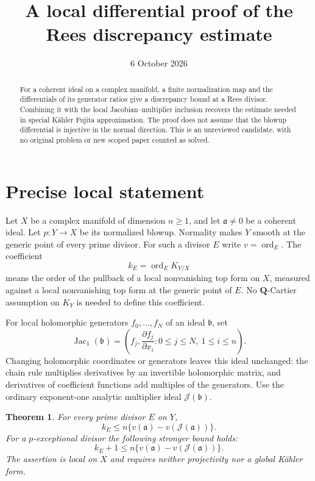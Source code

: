 \documentclass[11pt]{article}
\title{A local differential proof of the Rees discrepancy estimate}
\author{}
\date{6 October 2026}
\newcommand{\Jac}{\operatorname{Jac}}
\newcommand{\ord}{\operatorname{ord}}
\newcommand{\J}{\mathcal J}
\newtheorem{theorem}{Theorem}
\begin{document}
\maketitle

\begin{abstract}
For a coherent ideal on a complex manifold, a finite normalization map
and the differentials of its generator ratios give a discrepancy bound
at a Rees divisor. Combining it with the local Jacobian--multiplier
inclusion recovers the estimate needed in special K\"ahler Fujita
approximation. The proof does not assume that the blowup differential
is injective in the normal direction. This is an unreviewed candidate,
with no original problem or new scoped paper counted as solved.
\end{abstract}

\section{Precise local statement}

Let $X$ be a complex manifold of dimension $n\geq1$, and let
$\mathfrak a\ne0$ be a coherent ideal. Let
$p:Y\to X$ be its normalized blowup. Normality makes $Y$ smooth
at the generic point of every prime divisor. For such a divisor
$E$ write $v=\ord_E$. The coefficient
\[
 k_E=\ord_E K_{Y/X}
\]
means the order of the pullback of a local nonvanishing top form
on $X$, measured against a local nonvanishing top form at the
generic point of $E$. No $\mathbf Q$-Cartier assumption on
$K_Y$ is needed to define this coefficient.

For local holomorphic generators $f_0,\ldots,f_N$ of an ideal
$\mathfrak b$, set
\[
 \Jac_1(\mathfrak b)=
 \left(f_j,\frac{\partial f_j}{\partial x_i}:
              0\leq j\leq N,\ 1\leq i\leq n\right).
 \tag{1}
\]
Changing holomorphic coordinates or generators leaves this
ideal unchanged: the chain rule multiplies derivatives by an
invertible holomorphic matrix, and derivatives of coefficient
functions add multiples of the generators.
Use the ordinary exponent-one analytic multiplier ideal
$\J(\mathfrak b)$.

\begin{theorem}
For every prime divisor $E$ on $Y$,
\[
 k_E\leq n\{v(\mathfrak a)-v(\J(\mathfrak a))\}.
 \tag{2}
\]
For a $p$-exceptional divisor the following stronger bound holds:
\[
 k_E+1\leq n\{v(\mathfrak a)-v(\J(\mathfrak a))\}.
 \tag{3}
\]
The assertion is local on $X$ and requires neither projectivity
nor a global K\"ahler form.
\end{theorem}
\end{document}
